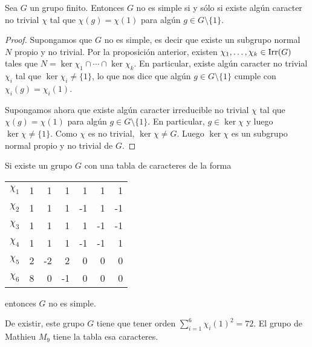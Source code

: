 \begin{proposition}
    Sea $G$ un grupo finito. Entonces $G$ no es simple si y sólo si 
    existe algún caracter no trivial $\chi$ tal que $\chi(g)=\chi(1)$ 
    para algún $g\in G\setminus\{1\}$. 
\end{proposition}

\begin{proof}
    Supongamos que $G$ no es simple, es decir que existe un subgrupo normal $N$ propio y no trivial. 
    Por la proposición anterior, existen $\chi_1,\dots,\chi_k\in\operatorname{Irr}(G)$ tales que
    $N=\ker\chi_1\cap\cdots\cap\ker\chi_k$.
    En particular, existe algún caracter no trivial 
    $\chi_i$ tal que $\ker\chi_i\ne\{1\}$, lo que nos dice
    que algún $g\in G\setminus\{1\}$ cumple con $\chi_i(g)=\chi_i(1)$. 
    
    Supongamos ahora que existe algún caracter irreducible no trivial $\chi$ 
    tal que $\chi(g)=\chi(1)$ para algún $g\in G\setminus\{1\}$. En particular, $g\in\ker\chi$ 
    y luego $\ker\chi\ne\{1\}$. Como $\chi$ es no trivial, $\ker\chi\ne G$. Luego $\ker\chi$ es
    un subgrupo normal propio y no trivial de $G$. 
\end{proof}

\begin{example}
    Si existe un grupo $G$ con una tabla de caracteres de la forma
    \begin{center}
		\begin{tabular}{|c|rrrrrr|}
			\hline
			$\chi_{1}$ & 1 & 1 & 1 & 1 & 1 & 1\tabularnewline
			$\chi_{2}$ & 1 & 1 & 1 & -1 & 1 & -1 \tabularnewline
			$\chi_{3}$ & 1 & 1 & 1 & 1 & -1 & -1\tabularnewline
		    $\chi_{4}$ & 1 & 1 & 1 & -1 & -1 & 1\tabularnewline
			$\chi_{5}$ & 2 & -2 & 2 & 0 & 0 & 0\tabularnewline
			$\chi_{6}$ & 8 & 0 & -1 & 0 & 0 & 0\tabularnewline
			\hline
		\end{tabular}
	\end{center}
	entonces $G$ no es simple. 
	
	De existir, este grupo $G$ tiene que tener orden $\sum_{i=1}^6\chi_i(1)^2=72$. 
	El grupo de Mathieu $M_{9}$ 
	tiene la tabla esa caracteres. 
\end{example}



